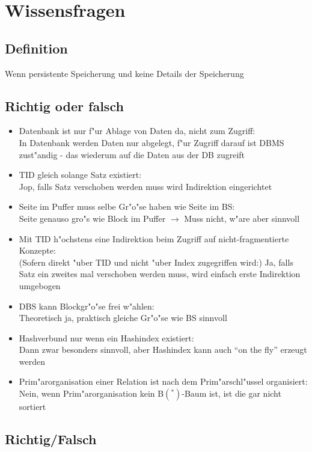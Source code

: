 \documentclass[a4paper, 12pt]{scrartcl}
\begin{document}
\section{Wissensfragen}
\subsection{Definition}
Wenn persistente Speicherung und keine Details der Speicherung
\subsection{Richtig oder falsch}
\begin{itemize}
	\item
		Datenbank ist nur f"ur Ablage von Daten da, nicht zum Zugriff:\\
		In Datenbank werden Daten nur abgelegt, f"ur Zugriff darauf ist DBMS zust"andig - das wiederum auf die Daten aus der DB zugreift
	\item
		TID gleich solange Satz existiert:\\
		Jop, falls Satz verschoben werden muss wird Indirektion eingerichtet
	\item
		Seite im Puffer muss selbe Gr"o"se haben wie Seite im BS:\\
		Seite genauso gro"s wie Block im Puffer  $\rightarrow$ Muss nicht, w"are aber sinnvoll
	\item
		Mit TID h"ochstens eine Indirektion beim Zugriff auf nicht-fragmentierte Konzepte:\\
		(Sofern direkt "uber TID und nicht "uber Index zugegriffen wird:) Ja, falls Satz ein zweites mal verschoben werden muss, wird einfach erste Indirektion umgebogen
	\item
		DBS kann Blockgr"o"se frei w"ahlen:\\
		Theoretisch ja, praktisch gleiche Gr"o"se wie BS sinnvoll
	\item
		Hashverbund nur wenn ein Hashindex existiert:\\
		Dann zwar besonders sinnvoll, aber Hashindex kann auch \enquote{on the fly} erzeugt werden
	\item
		Prim"arorganisation einer Relation ist nach dem Prim"arschl"ussel organisiert:\\
		Nein, wenn Prim"arorganisation kein B$(^*)$-Baum ist, ist die gar nicht sortiert
\end{itemize}
\subsection{Richtig/Falsch}
\end{document}
